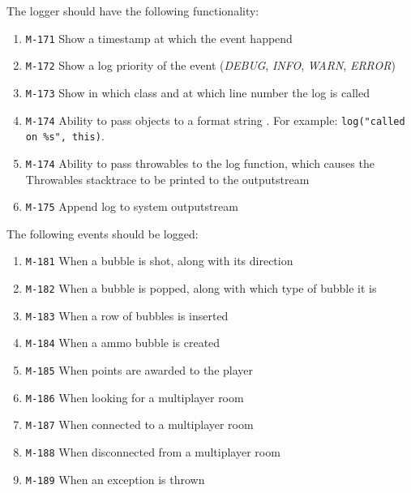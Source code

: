 \documentclass[a4paper]{article}
\begin{document}
\begin{itemize}
  The logger should have the following functionality:
       \begin{enumerate}
          \item \texttt{M-171} Show a timestamp at which the event happend
          \item \texttt{M-172} Show a log priority \citep{apachelog} of the event (\textit{DEBUG}, \textit{INFO}, \textit{WARN}, \textit{ERROR})
          \item \texttt{M-173} Show in which class and at which line number the log is called
          \item \texttt{M-174} Ability to pass objects to a format string \citep{formatstring}. For example: \texttt{log("called on \%s", this)}.
          \item \texttt{M-174} Ability to pass throwables to the log function, which causes
          the Throwables stacktrace to be printed to the outputstream \citep{throwable}
          \item \texttt{M-175} Append log to system outputstream
      \end{enumerate} 
  
  	The following events should be logged:
  
        \begin{enumerate}
          \item \texttt{M-181} When a bubble is shot, along with its direction
          \item \texttt{M-182} When a bubble is popped, along with which type of bubble it is
          \item \texttt{M-183} When a row of bubbles is inserted
          \item \texttt{M-184} When a ammo bubble is created
          \item \texttt{M-185} When points are awarded to the player
          \item \texttt{M-186} When looking for a multiplayer room
          \item \texttt{M-187} When connected to a multiplayer room
          \item \texttt{M-188} When disconnected from a multiplayer room
          \item \texttt{M-189} When an exception is thrown
      \end{enumerate}




\end{itemize}
\end{document}
